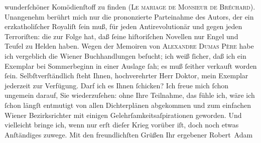 \begin{ledgroupsized}[t]{13cm}
                    wunderſchöner Komödienſtoff zu finden (\textsc{Le mariage de Monsieur de Bréchard}). Unangenehm berührt mich nur die prononzierte Parteinahme des Autors, der
                    ein erzkatholiſcher Royaliſt ſein muß, für jeden Antirevolutionär und gegen
                    jeden Terroriſten: die zur Folge hat, daß ſeine hiſtoriſchen Novellen nur Engel
                    und Teu{\pb}fel zu Helden haben.\pend
           \pstart
           Wegen der Memoiren von \textsc{Alexandre Dumas Père} habe ich vergeblich die Wiener
                    Buchhandlungen beſucht; ich weiß ſicher, daß ich ein Exemplar bei Sommerbeginn
                    in einer Auslage ſah; es muß ſeither verkauft worden ſein. Selbſtverſtändlich
                    ſteht Ihnen, hochverehrter Herr Doktor, mein Exemplar jederzeit zur Verfügung.
                    Darf ich es Ihnen ſchicken?\pend
           \pstart
           Ich freue mich ſchon ungemein darauf, Sie wiederzuſehen: ohne Ihre Teilnahme, das
                    fühle ich, wäre ich ſchon längſt entmutigt von allen Dichterplänen abgekommen
                    und zum einfachen Wiener Bezirksrichter mit
                    einigen Gelehrſamkeitsaſpirationen geworden. Und vielleicht bringe ich, wenn nur
                    erſt dieſer Krieg vorüber iſt, doch noch etwas Anſtändiges zuwege.\pend
           \pstart
           Mit den freundlichſten Grüßen Ihr ergebener\pend
           \pstart \spacefill\mbox{Robert Adam}\pend{}
         
         \endnumbering{}\end{ledgroupsized}  \newcommand{\dateiname}{L02241}\newcommand{\titel}{Robert Adam an Arthur Schnitzler, 24. 9. 1916}\newcommand{\editorInnen}{Martin Anton Müller und Gerd-Hermann Susen}
      